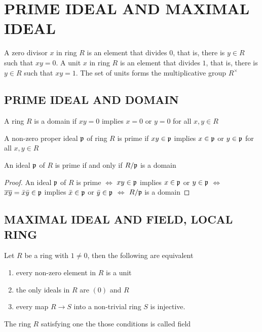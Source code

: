 \section{PRIME IDEAL AND MAXIMAL IDEAL}

\begin{definition}
	A zero divisor $x$ in ring $R$ is an element that divides $0$, that is, there is $y \in R$ such that $xy = 0$. A unit $x$ in ring $R$ is an element that divides $1$, that is, there is $y \in R$ such that $xy = 1$. The set of units forms the multiplicative group $R^\times$
\end{definition}


\subsection{PRIME IDEAL AND DOMAIN}

\begin{definition}[domain]
	A ring $R$ is a domain if $xy = 0$ implies $x = 0$ or $y = 0$ for all $x, y \in R$
\end{definition}

\begin{definition}
	A non-zero proper ideal $\mathfrak{p}$ of ring $R$ is prime if $xy \in \mathfrak{p}$ implies $x \in \mathfrak{p}$ or $y \in \mathfrak{p}$ for all $x, y \in R$
\end{definition}

\begin{proposition}
	An ideal $\mathfrak{p}$ of $R$ is prime if and only if $R / \mathfrak{p}$ is a domain
\end{proposition}

\begin{proof}
	An ideal $\mathfrak{p}$ of $R$ is prime $\iff$ $xy \in \mathfrak{p}$ implies $x \in \mathfrak{p}$ or $y \in \mathfrak{p}$ $\iff$ $\overline{xy} = \bar{x} \bar{y} \in \mathfrak{p}$ implies $\bar{x} \in \mathfrak{p}$ or $\bar{y} \in \mathfrak{p}$ $\iff$ $R / \mathfrak{p}$ is a domain
\end{proof}

\subsection{MAXIMAL IDEAL AND FIELD, LOCAL RING}

\begin{definition}[field]
	Let $R$ be a ring with $1 \neq 0$, then the following are equivalent
	\begin{enumerate}
		\item every non-zero element in $R$ is a unit
		\item the only ideals in $R$ are $(0)$ and $R$
		\item every map $R \to S$ into a non-trivial ring $S$ is injective.
	\end{enumerate}
	
	The ring $R$ satisfying one the those conditions is called field
\end{definition}

